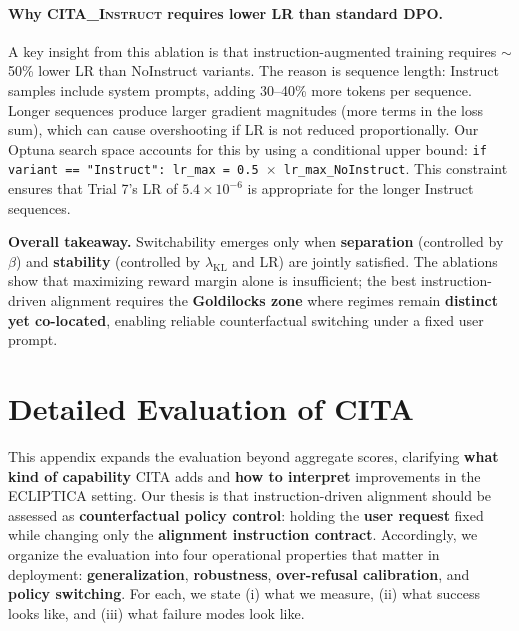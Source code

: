 \paragraph{Why \textsc{CITA\_Instruct} requires lower LR than standard DPO.}
A key insight from this ablation is that instruction-augmented training requires $\sim$50\% lower LR than NoInstruct variants.
The reason is sequence length: Instruct samples include system prompts, adding 30--40\% more tokens per sequence.
Longer sequences produce larger gradient magnitudes (more terms in the loss sum), which can cause overshooting if LR is not reduced proportionally.
Our Optuna search space accounts for this by using a conditional upper bound: \texttt{if variant == "Instruct": lr\_max = 0.5 $\times$ lr\_max\_NoInstruct}.
This constraint ensures that Trial 7's LR of $5.4 \times 10^{-6}$ is appropriate for the longer Instruct sequences.

\vspace{-0.25em}
\noindent
\textbf{Overall takeaway.}
Switchability emerges only when \textbf{separation} (controlled by $\beta$) and \textbf{stability} (controlled by $\lambda_{\text{KL}}$ and LR) are jointly satisfied.
The ablations show that maximizing reward margin alone is insufficient; the best instruction-driven alignment requires the \textbf{Goldilocks zone} where regimes remain \textbf{distinct yet co-located}, enabling reliable counterfactual switching under a fixed user prompt.





\clearpage
\newpage


\section{Detailed Evaluation of \textsc{CITA}}
\label{sec:appendix_benefits}

\vspace{-0.25em}
\noindent
This appendix expands the evaluation beyond aggregate scores, clarifying \textbf{what kind of capability} \textsc{CITA} adds and \textbf{how to interpret} improvements in the ECLIPTICA setting.
Our thesis is that instruction-driven alignment should be assessed as \textbf{counterfactual policy control}:
holding the \textbf{user request} fixed while changing only the \textbf{alignment instruction contract}.
Accordingly, we organize the evaluation into four operational properties that matter in deployment:
\textbf{generalization}, \textbf{robustness}, \textbf{over-refusal calibration}, and \textbf{policy switching}.
For each, we state (i) what we measure, (ii) what success looks like, and (iii) what failure modes look like.

